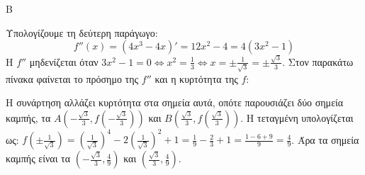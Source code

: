 \begin{thema}{Β}
\begin{erwthma}
\item Υπολογίζουμε τη δεύτερη παράγωγο:
\[ f''(x) = (4x^3 - 4x)' = 12x^2 - 4 = 4(3x^2 - 1) \]
Η $f''$ μηδενίζεται όταν $3x^2 - 1 = 0 \Leftrightarrow x^2 = \frac{1}{3} \Leftrightarrow x = \pm \frac{1}{\sqrt{3}} = \pm \frac{\sqrt{3}}{3}$.
Στον παρακάτω πίνακα φαίνεται το πρόσημο της $f''$ και η κυρτότητα της $f$:
\begin{center}
\end{center}
Η συνάρτηση αλλάζει κυρτότητα στα σημεία αυτά, οπότε παρουσιάζει δύο σημεία καμπής, τα $A(-\frac{\sqrt{3}}{3}, f(-\frac{\sqrt{3}}{3}))$ και $B(\frac{\sqrt{3}}{3}, f(\frac{\sqrt{3}}{3}))$.
H τεταγμένη υπολογίζεται ως:
$f\left(\pm \frac{1}{\sqrt{3}}\right) = \left(\frac{1}{\sqrt{3}}\right)^4 - 2\left(\frac{1}{\sqrt{3}}\right)^2 + 1 = \frac{1}{9} - \frac{2}{3} + 1 = \frac{1-6+9}{9} = \frac{4}{9}$. 
Άρα τα σημεία καμπής είναι τα $\left(-\frac{\sqrt{3}}{3}, \frac{4}{9}\right)$ και $\left(\frac{\sqrt{3}}{3}, \frac{4}{9}\right)$.
\end{erwthma}
\end{thema}

